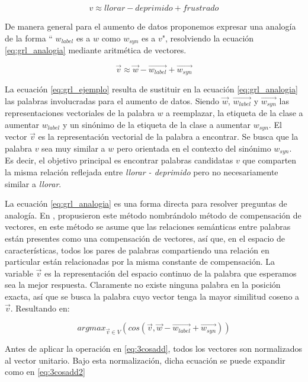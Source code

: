  \begin{equation}
    \label{eq:grl_ejemplo}
     v \approx  llorar-deprimido+frustrado
 \end{equation}


De manera general para el aumento de datos proponemos expresar una analogía de la forma `` $w_{label}$ es a $w$ como $w_{syn}$ es a $v$", resolviendo la ecuación \ref{eq:grl_analogia} mediante aritmética de vectores.

 \begin{equation}
    \label{eq:grl_analogia}
    \vec{v} \approx \vec{w}-\vec{w_{label}}+\vec{w_{syn}}
\end{equation}
 
La ecuación \ref{eq:grl_ejemplo} resulta de sustituir en la ecuación \ref{eq:grl_analogia} las palabras involucradas para el aumento de datos. 
Siendo $\vec{w}$, $\vec{w_{label}}$  y $\vec{w_{syn}}$ las representaciones vectoriales de la palabra $w$ a reemplazar, la etiqueta de la clase a aumentar $w_{label}$ y un sinónimo de la etiqueta de la clase a aumentar $w_{syn}$. El vector $\vec{v}$ es la representación vectorial de la palabra a encontrar. Se busca que la palabra $v$ sea muy similar a $w$ pero orientada en el contexto del sinónimo $w_{syn}$. Es decir, el objetivo principal es encontrar palabras candidatas $v$ que comparten la misma relación reflejada entre \textit{llorar - deprimido} pero no necesariamente similar a \textit{llorar}.

 La ecuación \ref{eq:grl_analogia} es una forma directa para resolver preguntas de analogía. En \citep{mikolov2013linguistic}, propusieron este método nombrándolo método de compensación de vectores, en este método se asume que las relaciones semánticas entre palabras están presentes como una compensación de vectores, así que, en el espacio de características, todos los pares de palabras compartiendo una relación en particular están relacionadas por la misma constante de compensación. La variable $\vec{v}$ es la representación del espacio continuo de la palabra que esperamos sea la mejor respuesta. Claramente no existe ninguna palabra en la posición exacta, así que se busca la palabra cuyo vector tenga la mayor similitud coseno a $\vec{v}$. Resultando en:

\begin{equation}
\label{eq:3cosadd}
    arg max_{\vec{v}\in V}( cos (\vec{v}, \vec{w}-\vec{w_{label}}+\vec{w_{syn}}))
\end{equation}

Antes de aplicar la operación en \ref{eq:3cosadd}, todos los vectores son normalizados al vector unitario. Bajo esta normalización, dicha ecuación se puede expandir como en \ref{eq:3cosadd2}

